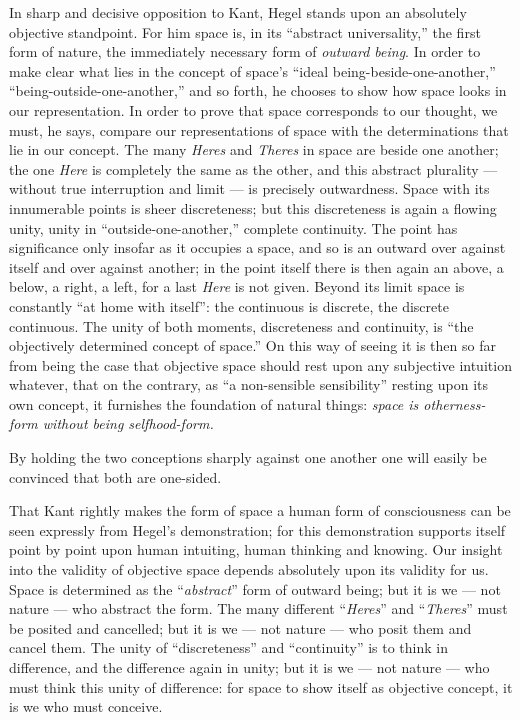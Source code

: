 \documentclass[12pt,a4paper]{book}
\begin{document}
In sharp and decisive opposition to Kant, Hegel stands upon an absolutely
objective standpoint. For him space is, in its ``abstract universality,'' the
first form of nature, the immediately necessary form of \emph{outward being}. In
order to make clear what lies in the concept of space's ``ideal
being-beside-one-another,''
``being-outside-one-another,'' and so forth, he chooses to show how space looks
in our representation. In order to prove that space corresponds to our thought,
we must, he says, compare our representations of space with the determinations
that lie in our concept. The many \emph{Heres} and \emph{Theres} in space are
beside one another; the one \emph{Here} is completely the same as the other, and
this abstract plurality --- without true interruption and limit --- is precisely
outwardness. Space with its innumerable points is sheer discreteness; but this
discreteness is again a flowing
unity, unity in ``outside-one-another,'' complete continuity. The point has
significance only insofar as it occupies a space, and so is an outward over
against itself and over against another; in the point itself there is then again
an above, a below, a right, a left, for a last \emph{Here} is not given. Beyond
its limit space is constantly ``at home with itself'': the continuous is
discrete, the discrete continuous. The unity of both moments, discreteness and
continuity, is ``the objectively determined concept of space.'' On this way of
seeing it is then so far from being the case that objective space should rest
upon any subjective intuition whatever, that on the contrary, as ``a
non-sensible sensibility'' resting upon its own concept, it furnishes the
foundation of natural things: \emph{space is otherness-form without being
selfhood-form.}

By holding the two conceptions sharply against one another one will easily be
convinced that both are one-sided.

That Kant rightly makes the form of space a human form of consciousness can be
seen expressly from Hegel's demonstration; for this demonstration supports
itself point by point upon human intuiting, human thinking and knowing. Our
insight into the validity of objective space depends absolutely upon its
validity for us. Space is determined as the ``\emph{abstract}'' form of outward
being; but it is we --- not nature --- who abstract the form. The many different
``\emph{Heres}'' and ``\emph{Theres}'' must be posited and cancelled; but it is
we --- not nature --- who posit them and cancel them. The unity of
``discreteness'' and ``continuity'' is to think in difference, and the
difference again in unity; but it is we --- not nature --- who must think this
unity of difference: for space to show itself as objective concept, it is we who
must conceive.
\end{document}
